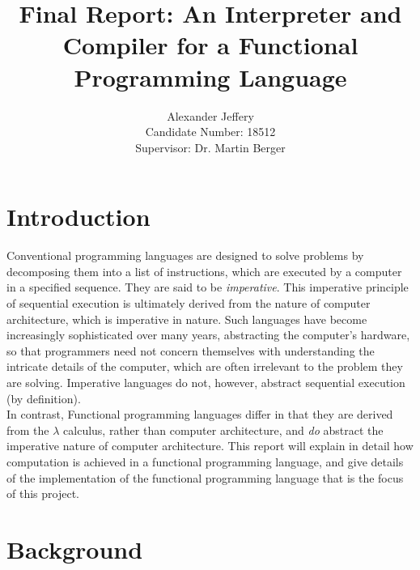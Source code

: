 \documentclass{article}
\title{\textbf{Final Report}: An Interpreter and Compiler for a Functional Programming Language}
\author{Alexander Jeffery\\
Candidate Number: 18512\\
Supervisor: Dr. Martin Berger}
\begin{document}
\maketitle

\section{Introduction}

Conventional programming languages are designed to solve problems by decomposing them into a list of instructions, which are executed by a computer in a specified sequence. They are said to be \emph{imperative}. This imperative principle of sequential execution is ultimately derived from the nature of computer architecture, which is imperative in nature. Such languages have become increasingly sophisticated over many years, abstracting the computer's hardware, so that programmers need not concern themselves with understanding the intricate details of the computer, which are often irrelevant to the problem they are solving. Imperative languages do not, however, abstract sequential execution (by definition).
\\
\indent In contrast, Functional programming languages differ in that they are derived from the $\lambda$ calculus, rather than computer architecture, and \emph{do} abstract the imperative nature of computer architecture. This report will explain in detail how computation is achieved in a functional programming language, and give details of the implementation of the functional programming language that is the focus of this project.

\pagebreak
\section{Background}
\end{document}
